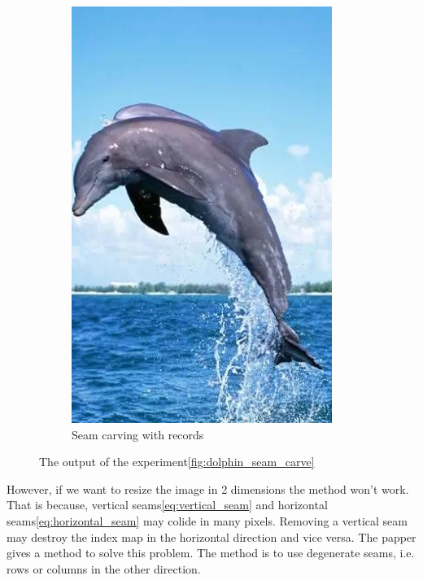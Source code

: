 \documentclass[final]{cvpr}
\begin{document}
\begin{figure}[htb]
\begin{center}
\begin{subfigure}[b]{0.24\linewidth}
    \includegraphics[width=\textwidth]{dolphin_seam_carving_as_records.jpg}
    \caption{Seam carving with records}
\end{subfigure}
\end{center}
\caption{The output of the experiment\ref{fig:dolphin_seam_carve}}
\label{fig:dolphin_seam_carve_output}
\end{figure}

However, if we want to resize the image in 2 dimensions the method won't work.
That is because, vertical seams\ref{eq:vertical_seam} and horizontal seams\ref{eq:horizontal_seam} may colide in many pixels.
Removing a vertical seam may destroy the index map in the horizontal direction and vice versa.
The papper\cite{avidan2007seam} gives a method to solve this problem.
The method is to use degenerate seams, i.e. rows or columns in the other direction.
\end{document}

